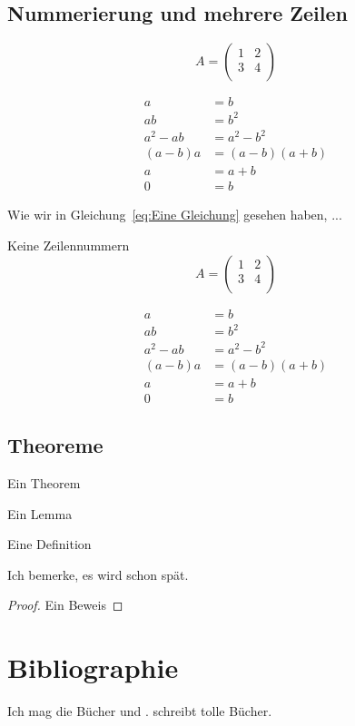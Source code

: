 \documentclass[a4paper]{article}
\begin{document}
\subsection{Nummerierung und mehrere Zeilen}

\begin{equation}
A = 
\begin{pmatrix}
1 & 2\\
3 & 4\\
\end{pmatrix}\label{eq:Eine Gleichung}
\end{equation}

\begin{align}
a &= b\nonumber\\
ab &= b^2\nonumber\\
a^2 - ab &= a^2 - b^2\\
(a-b)a &= (a-b)(a + b)\nonumber\\
a &= a+b\nonumber\\
0 &= b
\end{align}

Wie wir in Gleichung~\ref{eq:Eine Gleichung} gesehen haben, ...

Keine Zeilennummern
\begin{equation*}
A = 
\begin{pmatrix}
1 & 2\\
3 & 4\\
\end{pmatrix}\label{eq:Eine Gleichung}
\end{equation*}

\begin{align*}
a &= b\\
ab &= b^2\\
a^2 - ab &= a^2 - b^2\\
(a-b)a &= (a-b)(a + b)\\
a &= a+b\\
0 &= b
\end{align*}


\subsection{Theoreme}

\begin{thm}
Ein Theorem
\end{thm}
\begin{lem}
Ein Lemma
\end{lem}
\begin{defin}
Eine Definition
\end{defin}

\begin{rem}
Ich bemerke, es wird schon spät.
\end{rem}

\begin{proof}
Ein Beweis
\end{proof}

\section{Bibliographie}

Ich mag die Bücher \cite[\S~5, Abs.~7]{kafka2015prozess} und \cite{AC02615918}. \textcite{kafka2015prozess} schreibt tolle Bücher.

\printbibliography
\end{document}

